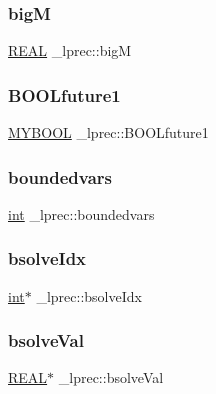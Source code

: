 \subsubsection{\texorpdfstring{bigM}{bigM}}
{\footnotesize\ttfamily \hyperlink{lp__lib_8h_a92bd5e363d131fa73669358edb232dce}{R\+E\+AL} \+\_\+lprec\+::bigM}

\mbox{\label{struct__lprec_a1aec0f1f92b20101762a33f2234e820a}} 
\subsubsection{\texorpdfstring{B\+O\+O\+Lfuture1}{BOOLfuture1}}
{\footnotesize\ttfamily \hyperlink{lp__lib_8h_aad848328fb3018217ac9f01d97b6bd88}{M\+Y\+B\+O\+OL} \+\_\+lprec\+::\+B\+O\+O\+Lfuture1}

\mbox{\label{struct__lprec_a6f12a80e4c086c6b84e92200b287da6b}} 
\subsubsection{\texorpdfstring{boundedvars}{boundedvars}}
{\footnotesize\ttfamily \hyperlink{lp__lib_8h_adeb9ec6400320e4923ac9d836d509ddb}{int} \+\_\+lprec\+::boundedvars}

\mbox{\label{struct__lprec_ad618e0096bc7baaf24be4aed8cc63e75}} 
\subsubsection{\texorpdfstring{bsolve\+Idx}{bsolveIdx}}
{\footnotesize\ttfamily \hyperlink{lp__lib_8h_adeb9ec6400320e4923ac9d836d509ddb}{int}$\ast$ \+\_\+lprec\+::bsolve\+Idx}

\mbox{\label{struct__lprec_a7a83e7832f44f037cb09c36c2046ead6}} 
\subsubsection{\texorpdfstring{bsolve\+Val}{bsolveVal}}
{\footnotesize\ttfamily \hyperlink{lp__lib_8h_a92bd5e363d131fa73669358edb232dce}{R\+E\+AL}$\ast$ \+\_\+lprec\+::bsolve\+Val}

